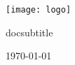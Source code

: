 \begin{titlepage}
	\centering
	\vspace*{1.5cm}
    \texttt{[image: logo]}\par
	\vspace{2.5cm}
	{\huge\bfseries\doctitle\par}
	\ifcsname docsubtitle\endcsname
		\vspace{0.5cm}
		{\LARGE\docsubtitle\par}
	\fi
	\vspace{2cm}
	{\Large\itshape\docauthor\par}
	\vfill
	{\large\today\par}
\end{titlepage}
